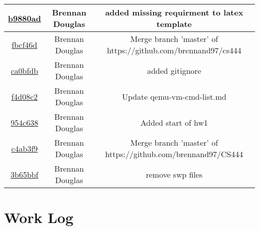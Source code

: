 \documentclass[onecolumn, draftclsnofoot,10pt, compsoc]{IEEEtran}
\begin{document}
\begin{center}
\begin{tabular}{ |c|c|c| }
        \href{https://github.com/brennand97/CS444/commit/b9880ada7935dc540c1276319866251979efda09}{b9880ad} & Brennan Douglas & added missing requirment to latex template\\\hline
        \href{https://github.com/brennand97/CS444/commit/fbcf46d30a49e0ef8be79d544f17704142b1f208}{fbcf46d} & Brennan Douglas & Merge branch 'master' of https://github.com/brennand97/cs444\\\hline
        \href{https://github.com/brennand97/CS444/commit/ca0bfdb5801e3399b69a10e54ed3dfe5cffd2bb4}{ca0bfdb} & Brennan Douglas & added gitignore\\\hline
        \href{https://github.com/brennand97/CS444/commit/f4d08c2fb0cb5284a177889bfdb230f3e13f9732}{f4d08c2} & Brennan Douglas & Update qemu-vm-cmd-list.md\\\hline
        \href{https://github.com/brennand97/CS444/commit/954c638162ca721804c39bc8dbcc5e613f6e1044}{954c638} & Brennan Douglas & Added start of hw1\\\hline
        \href{https://github.com/brennand97/CS444/commit/c4ab3f92b24dbbf7b4601c0dc022c6a404a97c95}{c4ab3f9} & Brennan Douglas & Merge branch 'master' of https://github.com/brennand97/CS444\\\hline
        \href{https://github.com/brennand97/CS444/commit/3b65bbf9fdce38fa8e998c2cd6e83ab691a57a19}{3b65bbf} & Brennan Douglas & remove swp files\\\hline
	\end{tabular}
\end{center}

\section{Work Log}
\end{document}
